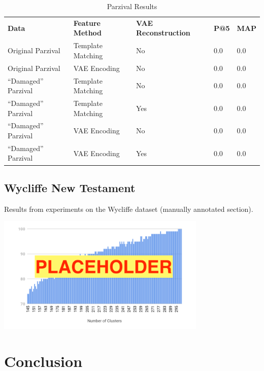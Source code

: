 \documentclass[final]{ukthesis}
\begin{document}
\begin{table}[h]
\centering
\caption{Parzival Results}
\label{my-label}
\begin{tabular}{lllll}
\textbf{Data}  & \textbf{Feature Method} & \textbf{VAE Reconstruction} & \textbf{P@5} & \textbf{MAP} \\
Original Parzival    & Template Matching       & No                          & 0.0          & 0.0          \\
Original Parzival    & VAE Encoding            & No                          & 0.0          & 0.0          \\
``Damaged'' Parzival & Template Matching       & No                          & 0.0          & 0.0          \\
``Damaged'' Parzival & Template Matching       & Yes                         & 0.0          & 0.0          \\
``Damaged'' Parzival & VAE Encoding            & No                          & 0.0          & 0.0          \\
``Damaged'' Parzival & VAE Encoding            & Yes                         & 0.0          & 0.0         
\end{tabular}
\end{table}




%
%
\section{Wycliffe New Testament}
Results from experiments on the Wycliffe dataset (manually annotated section).

\begin{center}
\includegraphics[width=10cm]{placeholder}
\end{center}





%
%
%
\chapter{Conclusion}
\end{document}
